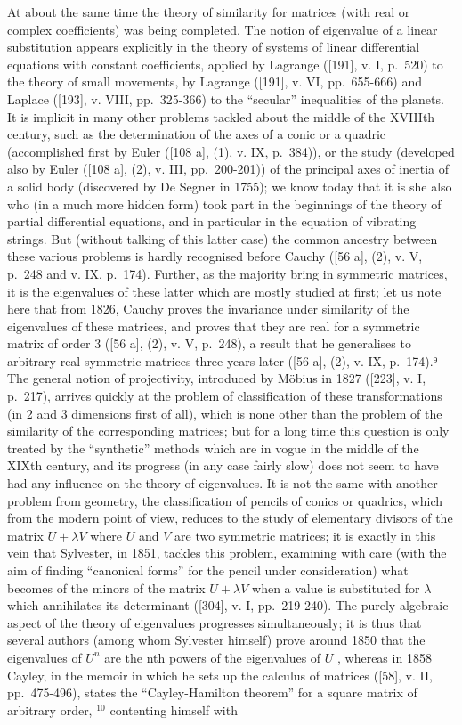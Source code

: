 At about the same time the theory of similarity for matrices (with real or complex coefficients) was being completed. The notion of eigenvalue of a linear substitution appears explicitly in the theory of systems of linear differential equations with constant coefficients, applied by Lagrange ({[}191{]}, v. I, p.~520) to the theory of small movements, by Lagrange ({[}191{]}, v. VI, pp.~655-666) and Laplace ({[}193{]}, v. VIII, pp.~325-366) to the ``secular'' inequalities of the planets. It is implicit in many other problems tackled about the middle of the XVIIIth century, such as the determination of the axes of a conic or a quadric (accomplished first by Euler ({[}108 a{]}, (1), v. IX, p.~384)), or the study (developed also by Euler ({[}108 a{]}, (2), v. III, pp.~200-201)) of the principal axes of inertia of a solid body (discovered by De Segner in 1755); we know today that it is she also who (in a much more hidden form) took part in the beginnings of the theory of partial differential equations, and in particular in the equation of vibrating strings. But (without talking of this latter case) the common ancestry between these various problems is hardly recognised before Cauchy ({[}56 a{]}, (2), v. V, p.~248 and v. IX, p.~174). Further, as the majority bring in symmetric matrices, it is the eigenvalues of these latter which are mostly studied at first; let us note here that from 1826, Cauchy proves the invariance under similarity of the eigenvalues of these matrices, and proves that they are real for a symmetric matrix of order 3 ({[}56 a{]}, (2), v. V, p.~248), a result that he generalises to arbitrary real symmetric matrices three years later ({[}56 a{]}, (2), v. IX, p.~174).⁹ The general notion of projectivity, introduced by Möbius in 1827 ({[}223{]}, v. I, p.~217), arrives quickly at the problem of classification of these transformations (in 2 and 3 dimensions first of all), which is none other than the problem of the similarity of the corresponding matrices; but for a long time this question is only treated by the ``synthetic'' methods which are in vogue in the middle of the XIXth century, and its progress (in any case fairly slow) does not seem to have had any influence on the theory of eigenvalues. It is not the same with another problem from geometry, the classification of pencils of conics or quadrics, which from the modern point of view, reduces to the study of elementary divisors of the matrix \(U + \lambda V\) where \(U\) and \(V\) are two symmetric matrices; it is exactly in this vein that Sylvester, in 1851, tackles this problem, examining with care (with the aim of finding ``canonical forms'' for the pencil under consideration) what becomes of the minors of the matrix \(U + \lambda V\) when a value is substituted for \(\lambda\) which annihilates its determinant ({[}304{]}, v. I, pp.~219-240). The purely algebraic aspect of the theory of eigenvalues progresses simultaneously; it is thus that several authors (among whom Sylvester himself) prove around 1850 that the eigenvalues of \(U^n\) are the nth powers of the eigenvalues of \(U\) , whereas in 1858 Cayley, in the memoir in which he sets up the calculus of matrices ({[}58{]}, v. II, pp.~475-496), states the ``Cayley-Hamilton theorem'' for a square matrix of arbitrary order, \(^{10}\) contenting himself with 